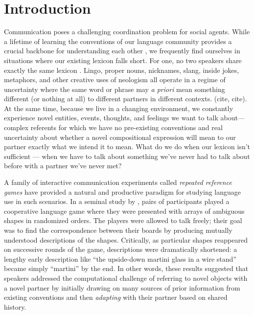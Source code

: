 \documentclass[alpha-refs]{wiley-article}
\begin{document}
\section{Introduction}\label{introduction}

Communication poses a challenging coordination problem for social agents. 
While a lifetime of learning the conventions of our language community provides a crucial backbone for understanding each other \citep{lewisConventionPhilosophicalStudy1969}, we frequently find ourselves in situations where our existing lexicon falls short.
For one, no two speakers share exactly the same lexicon \citep{Davidson86_DerangementOfEpitaphs, Clark98_CommunalLexicons}. 
Lingo, proper nouns, nicknames, slang, inside jokes, metaphors, and other creative uses of neologism all operate in a regime of uncertainty where the same word or phrase may \emph{a priori} mean something different (or nothing at all) to different partners in different contexts. (cite, cite).
At the same time, because we live in a changing environment, we constantly experience novel entities, events, thoughts, and feelings we want to talk about---complex referents for which we have no pre-existing conventions and real uncertainty about whether a novel compositional expression will mean to our partner exactly what we intend it to mean.
What do we do when our lexicon isn't sufficient --- when we have to talk about something we've never had to talk about before with a partner we've never met?

A family of interactive communication experiments called \emph{repeated reference games} have provided a natural and productive paradigm for studying language use in such scenarios. In a seminal study by \cite{KraussWeinheimer64_ReferencePhrases}, pairs of participants played a cooperative language game where they were presented with arrays of ambiguous shapes in randomized orders. 
The players were allowed to talk freely; their goal was to find the correspondence between their boards by producing mutually understood descriptions of the shapes. 
Critically, as particular shapes reappeared on successive rounds of the game, descriptions were dramatically shortened: a lengthy early description like ``the upside-down martini glass in a wire stand'' became simply ``martini'' by the end. 
In other words, these results suggested that speakers addressed the computational challenge of referring to novel objects with a novel partner by initially drawing on many sources of prior information from existing conventions and then \emph{adapting} with their partner based on shared history.
\end{document}
